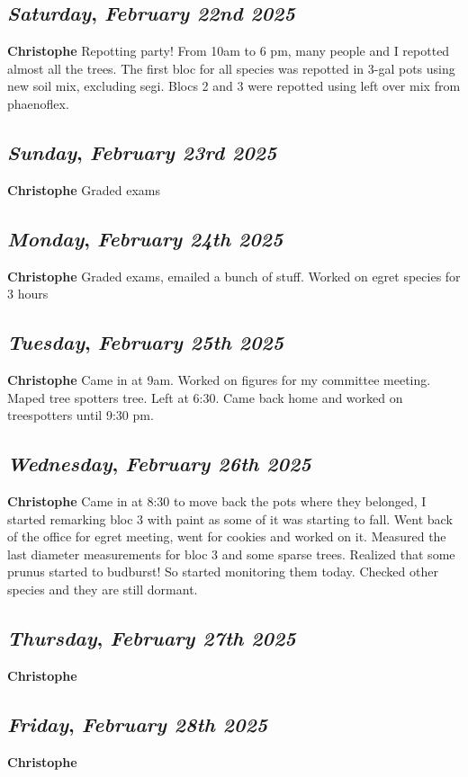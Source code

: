 \def\day{\textit{February 22nd 2025}}
\def\weekday{\textit{Saturday}}
\subsection*{\weekday, \day}
\textbf {Christophe}
Repotting party! From 10am to 6 pm, many people and I repotted almost all the trees. The first bloc for all species was repotted in 3-gal pots using new soil mix, excluding segi. Blocs 2 and 3 were repotted using left over mix from phaenoflex. 

\def\day{\textit{February 23rd 2025}}
\def\weekday{\textit{Sunday}}
\subsection*{\weekday, \day}
\textbf {Christophe}
Graded exams
\def\day{\textit{February 24th 2025}}
\def\weekday{\textit{Monday}}
\subsection*{\weekday, \day}
\textbf {Christophe}
Graded exams, emailed a bunch of stuff. Worked on egret species for 3 hours

\def\day{\textit{February 25th 2025}}
\def\weekday{\textit{Tuesday}}
\subsection*{\weekday, \day}
\textbf {Christophe}
Came in at 9am. Worked on figures for my committee meeting. Maped tree spotters tree. Left at 6:30. Came back home and worked on treespotters until 9:30 pm. 

\def\day{\textit{February 26th 2025}}
\def\weekday{\textit{Wednesday}}
\subsection*{\weekday, \day}
\textbf {Christophe}
Came in at 8:30 to move back the pots where they belonged, I started remarking bloc 3 with paint as some of it was starting to fall. Went back of the office for egret meeting, went for cookies and worked on it. Measured the last diameter measurements for bloc 3 and some sparse trees. Realized that some prunus started to budburst! So started monitoring them today. Checked other species and they are still dormant. 

\def\day{\textit{February 27th 2025}}
\def\weekday{\textit{Thursday}}
\subsection*{\weekday, \day}
\textbf {Christophe}

\def\day{\textit{February 28th 2025}}
\def\weekday{\textit{Friday}}
\subsection*{\weekday, \day}
\textbf {Christophe}
